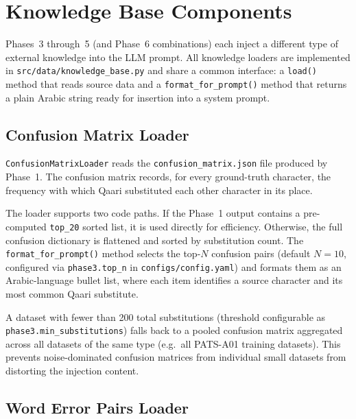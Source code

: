 \section{Knowledge Base Components}
\label{sec:kb}

Phases~3 through~5 (and Phase~6 combinations) each inject a different type of
external knowledge into the LLM prompt.
All knowledge loaders are implemented in \texttt{src/data/knowledge\_base.py}
and share a common interface: a \texttt{load()} method that reads source data
and a \texttt{format\_for\_prompt()} method that returns a plain Arabic string
ready for insertion into a system prompt.

\subsection{Confusion Matrix Loader}
\label{subsec:kb_confusion}

\texttt{ConfusionMatrixLoader} reads the \texttt{confusion\_matrix.json} file
produced by Phase~1.
The confusion matrix records, for every ground-truth character, the frequency
with which Qaari substituted each other character in its place.

The loader supports two code paths.
If the Phase~1 output contains a pre-computed \texttt{top\_20} sorted list, it is
used directly for efficiency.
Otherwise, the full confusion dictionary is flattened and sorted by substitution
count.
The \texttt{format\_for\_prompt()} method selects the top-$N$ confusion pairs
(default $N = 10$, configured via \texttt{phase3.top\_n} in
\texttt{configs/config.yaml}) and formats them as an Arabic-language bullet list,
where each item identifies a source character and its most common Qaari substitute.

A dataset with fewer than 200 total substitutions (threshold configurable as
\texttt{phase3.min\_substitutions}) falls back to a pooled confusion matrix
aggregated across all datasets of the same type (e.g.\ all PATS-A01 training
datasets).
This prevents noise-dominated confusion matrices from individual small datasets
from distorting the injection content.

\subsection{Word Error Pairs Loader}
\label{subsec:kb_word_pairs}


